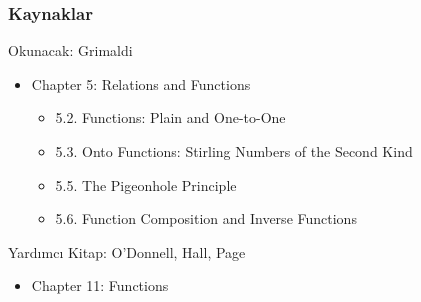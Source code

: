 \documentclass[dvipsnames]{beamer}
\theoremstyle{definition}
\theoremstyle{example}
\theoremstyle{plain}
\begin{document}
\begin{frame}
  \frametitle{Kaynaklar}

  \begin{block}{Okunacak: Grimaldi}
    \begin{itemize}
      \item Chapter 5: Relations and Functions
      \begin{itemize}
        \item 5.2. \alert{Functions: Plain and One-to-One}
        \item 5.3. \alert{Onto Functions: Stirling Numbers of the Second Kind}
        \item 5.5. \alert{The Pigeonhole Principle}
        \item 5.6. \alert{Function Composition and Inverse Functions}
      \end{itemize}
    \end{itemize}
  \end{block}

  \begin{block}{Yardımcı Kitap: O'Donnell, Hall, Page}
    \begin{itemize}
      \item Chapter 11: Functions
    \end{itemize}
  \end{block}
\end{frame}
\end{document}
